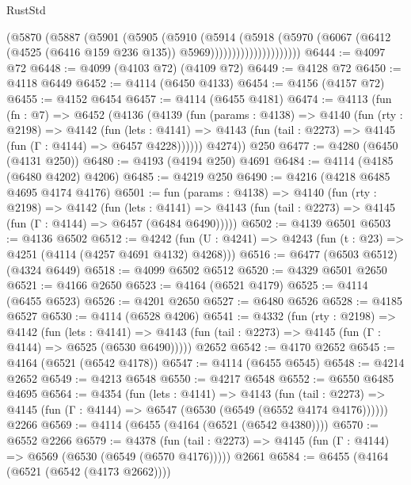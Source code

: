 \begin{lexlean}{RustStd}
\begin{coremodule}
{\begin{coremodule}
{{{{{{{{{{{{{{                          (@5870
                            (@5887
                              (@5901
                                (@5905
                                  (@5910
                                    (@5914
                                      (@5918
                                        (@5970
                                          (@6067
                                            (@6412
                                              (@4525 (@6416 @159 @236 @135))
                                              @5969)))))))))))))))))))))
@6444 := @4097 @72
@6448 := @4099 (@4103 @72) (@4109 @72)
@6449 := @4128 @72
@6450 := @4118 @6449
@6452 := @4114 (@6450 @4133)
@6454 := @4156 (@4157 @72)
@6455 := @4152 @6454
@6457 := @4114 (@6455 @4181)
@6474 := @4113
    (fun (fn : @7) =>
    @6452
      (@4136
        (@4139
          (fun (params : @4138) =>
          @4140
            (fun (rty : @2198) =>
            @4142
              (fun (lets : @4141) =>
              @4143 (fun (tail : @2273) => @4145 (fun (Γ : @4144) => @6457 @4228))))))
        @4274))
    @250
@6477 := @4280 (@6450 (@4131 @250))
@6480 := @4193 (@4194 @250) @4691
@6484 := @4114 (@4185 (@6480 @4202) @4206)
@6485 := @4219 @250
@6490 := @4216 (@4218 @6485 @4695 @4174 @4176)
@6501 := fun (params : @4138) =>
  @4140
    (fun (rty : @2198) =>
    @4142
      (fun (lets : @4141) =>
      @4143 (fun (tail : @2273) => @4145 (fun (Γ : @4144) => @6457 (@6484 @6490)))))
@6502 := @4139 @6501
@6503 := @4136 @6502
@6512 := @4242 (fun (U : @4241) => @4243 (fun (t : @23) => @4251 (@4114 (@4257 @4691 @4132) @4268)))
@6516 := @6477 (@6503 @6512) (@4324 @6449)
@6518 := @4099 @6502 @6512
@6520 := @4329 @6501 @2650
@6521 := @4166 @2650
@6523 := @4164 (@6521 @4179)
@6525 := @4114 (@6455 @6523)
@6526 := @4201 @2650
@6527 := @6480 @6526
@6528 := @4185 @6527
@6530 := @4114 (@6528 @4206)
@6541 := @4332
    (fun (rty : @2198) =>
    @4142
      (fun (lets : @4141) =>
      @4143 (fun (tail : @2273) => @4145 (fun (Γ : @4144) => @6525 (@6530 @6490)))))
    @2652
@6542 := @4170 @2652
@6545 := @4164 (@6521 (@6542 @4178))
@6547 := @4114 (@6455 @6545)
@6548 := @4214 @2652
@6549 := @4213 @6548
@6550 := @4217 @6548
@6552 := @6550 @6485 @4695
@6564 := @4354
    (fun (lets : @4141) =>
    @4143
      (fun (tail : @2273) => @4145 (fun (Γ : @4144) => @6547 (@6530 (@6549 (@6552 @4174 @4176))))))
    @2266
@6569 := @4114 (@6455 (@4164 (@6521 (@6542 @4380))))
@6570 := @6552 @2266
@6579 := @4378
    (fun (tail : @2273) => @4145 (fun (Γ : @4144) => @6569 (@6530 (@6549 (@6570 @4176)))))
    @2661
@6584 := @6455 (@4164 (@6521 (@6542 (@4173 @2662))))
}}}}}}}}}}}}}}
\end{coremodule}}
\end{coremodule}
\end{lexlean}
